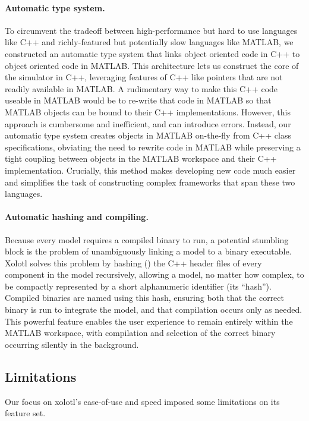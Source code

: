 \documentclass{frontiersSCNS} %
\begin{document}
\paragraph{Automatic type system.}
To circumvent the tradeoff between high-performance but hard to use languages like C++ and richly-featured but potentially slow languages like MATLAB, we constructed an automatic type system that links object oriented code in C++ to object oriented code in MATLAB. This architecture lets us construct the core of the simulator in C++, leveraging features of C++ like pointers that are not readily available in MATLAB. A rudimentary way to make this C++ code useable in MATLAB would be to re-write that code in MATLAB so that MATLAB objects can be bound to their C++ implementations. However, this approach is cumbersome and inefficient, and can introduce errors. Instead, our automatic type system creates objects in MATLAB on-the-fly from C++ class specifications, obviating the need to rewrite code in MATLAB while preserving a tight coupling between objects in the MATLAB workspace and their C++ implementation. Crucially, this method makes developing new code much easier and simplifies the task of constructing complex frameworks that span these two languages.

\paragraph{Automatic hashing and compiling.}
Because every model requires a compiled binary to run, a potential stumbling block is the problem of unambiguously linking a model to a binary executable. Xolotl solves this problem by hashing (\cite{rivestMD5MessageDigestAlgorithm1992}) the C++ header files of every component in the model recursively, allowing a model, no matter how complex, to be compactly represented by a short alphanumeric identifier (its ``hash''). Compiled binaries are named using this hash, ensuring both that the correct binary is run to integrate the model, and that compilation occurs only as needed. This powerful feature enables the user experience to remain entirely within the MATLAB workspace, with compilation and selection of the correct binary occurring silently in the background. 


\subsection{Limitations}
\label{limitations}

Our focus on xolotl's ease-of-use and speed imposed some limitations on its feature set. 
\end{document}
